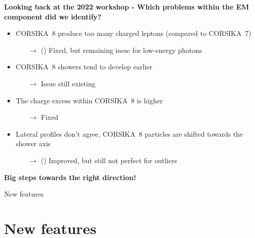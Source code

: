 \documentclass[aspectratio=1610, 9pt]{beamer}
\begin{document}
\begin{frame}

\textbf{Looking back at the 2022 workshop - Which problems within the EM component did we identify?}
\vspace{5mm}
      \begin{itemize}
        \item CORSIKA~8 produce too many charged leptons (compared to CORSIKA~7)
        \begin{itemize}
          \item[$\rightarrow$] () Fixed, but remaining issue for low-energy photons
        \end{itemize}
        \item CORSIKA~8 showers tend to develop earlier
        \begin{itemize}
          \item[$\rightarrow$]  Issue still existing
        \end{itemize}
        \item The charge excess within CORSIKA~8 is higher
        \begin{itemize}
          \item[$\rightarrow$]  Fixed
        \end{itemize}
        \item Lateral profiles don't agree, CORSIKA~8 particles are shifted towards the shower axis
        \begin{itemize}
          \item[$\rightarrow$] () Improved, but still not perfect for outliers
        \end{itemize}
      \end{itemize}

      \vspace{10mm}
      \centering
      \textbf{Big steps towards the right direction!}

\end{frame}


\begin{frame}
  \begin{center}
    \Huge New features
  \end{center}
\end{frame}

\section{New features}
\end{document}
